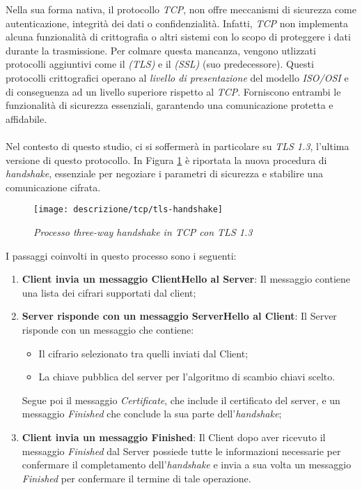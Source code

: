 \noindent Nella sua forma nativa, il protocollo \emph{TCP}, non offre meccanismi di sicurezza come autenticazione, integrità dei dati o confidenzialità. Infatti, \emph{TCP} non implementa alcuna funzionalità di crittografia o altri sistemi con lo scopo di proteggere i dati durante la trasmissione.
Per colmare questa mancanza, vengono utlizzati protocolli aggiuntivi come il \emph{ (\gls*{TLS})} e il \emph{ (\gls*{SSL})} (suo predecessore). Questi protocolli crittografici operano al \emph{livello di presentazione} del modello \emph{ISO/OSI} e di conseguenza ad un livello superiore rispetto al \emph{TCP}.
Forniscono entrambi le funzionalità di sicurezza essenziali, garantendo una comunicazione protetta e affidabile.
\\\\
Nel contesto di questo studio, ci si soffermerà in particolare su \emph{TLS 1.3}, l'ultima versione di questo protocollo. 
In Figura \ref{tlsHand} è riportata la nuova procedura di \emph{handshake}, essenziale per negoziare i parametri di sicurezza e stabilire una comunicazione cifrata.
\begin{figure}[!h]
    \centering
    \texttt{[image: descrizione/tcp/tls-handshake]}
    \caption{\emph{Processo three-way handshake in TCP con TLS 1.3}}
    \label{tlsHand}
\end{figure}

\noindent I passaggi coinvolti in questo processo sono i seguenti: 
\begin{enumerate}
    \item \textbf{Client invia un messaggio ClientHello al Server}: Il messaggio contiene una lista dei cifrari supportati dal client;
    \item \textbf{Server risponde con un messaggio ServerHello al Client}: Il Server risponde con un messaggio che contiene: 
    \begin{itemize}
        \item  Il cifrario selezionato tra quelli inviati dal Client;
        \item  La chiave pubblica del server per l'algoritmo di scambio chiavi scelto.
    \end{itemize}
    Segue poi il messaggio \emph{Certificate}, che include il certificato del server, e un messaggio \emph{Finished} che conclude la sua parte dell'\emph{handshake};
    \item \textbf{Client invia un messaggio Finished}: Il Client dopo aver ricevuto il messaggio \emph{Finished} dal Server possiede tutte le informazioni necessarie per confermare il completamento dell'\emph{handshake} e invia a sua volta un messaggio \emph{Finished} per confermare il termine di tale operazione.
\end{enumerate}

